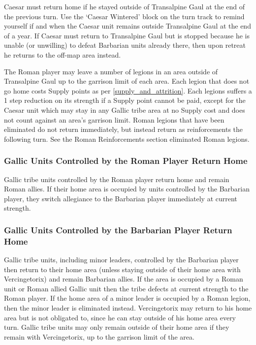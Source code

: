 Caesar must return home if he stayed outside of Transalpine Gaul at the end of the previous turn. Use the ‘Caesar Wintered’ block on the turn track to remind yourself if and when the Caesar unit remains outside Transalpine Gaul at the end of a year. If Caesar must return to Transalpine Gaul but is stopped because he is unable (or unwilling) to defeat Barbarian units already there, then upon retreat he returns to the off-map area instead.

The Roman player may leave a number of legions in an area outside of Transalpine Gaul up to the garrison limit of each area. Each legion that does not go home costs Supply points as per \ref{supply_and_attrition}. Each legions suffers a 1 step reduction on its strength if a Supply point cannot be paid, except for the Caesar unit which may stay in any Gallic tribe area at no Supply cost and does not count against an area's garrison limit. Roman legions that have been eliminated do not return immediately, but instead return as reinforcements the following turn. See the Roman Reinforcements section eliminated Roman legions.

\subsubsection{Gallic Units Controlled by the Roman Player Return Home}
\par
Gallic tribe units controlled by the Roman player return home and remain Roman allies. If their home area is occupied by units controlled by the Barbarian player, they switch allegiance to the Barbarian player immediately at current strength.

\subsubsection{Gallic Units Controlled by the Barbarian Player Return Home}
\par
Gallic tribe units, including minor leaders, controlled by the Barbarian player then return to their home area (unless staying outside of their home area with Vercingetorix) and remain Barbarian allies. If the area is occupied by a Roman unit or Roman allied Gallic unit then the tribe defects at current strength to the Roman player. If the home area of a minor leader is occupied by a Roman legion, then the minor leader is eliminated instead. Vercingetorix may return to his home area but is not obligated to, since he can stay outside of his home area every turn. Gallic tribe units may only remain outside of their home area if they remain with Vercingetorix, up to the garrison limit of the area.

